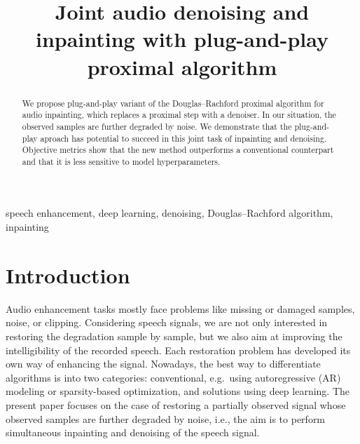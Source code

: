 \documentclass[conference]{IEEEtran}
\begin{document}
\title{Joint audio denoising and inpainting with plug-and-play proximal algorithm}

\author{
\and
{}
}

\maketitle

\begin{abstract}
We propose plug-and-play variant of the Douglas--Rachford proximal algorithm for audio inpainting, which replaces a proximal step with a denoiser.
In our situation, the observed samples are further degraded by noise.
We demonstrate that the plug-and-play aproach has potential to succeed in this joint task of inpainting and denoising.
Objective metrics show that the new method outperforms a conventional counterpart and that it is less sensitive to model hyperparameters.
\end{abstract}

\begin{IEEEkeywords}
speech enhancement, deep learning, denoising, Douglas--Rachford algorithm, inpainting
\end{IEEEkeywords}

\section{Introduction}

Audio enhancement tasks mostly face problems like missing or damaged samples, noise, or clipping.
Considering speech signals, 
we are not only interested in restoring the degradation sample by sample, but we also aim at improving the intelligibility of the recorded speech.
Each restoration problem has developed its own way of enhancing the signal.
Nowadays, the best way to differentiate algorithms is into two categories:
conventional, e.g.\ using autoregressive (AR) modeling or sparsity-based optimization, and solutions using deep learning.
The present paper focuses on the case of restoring a partially observed signal whose observed samples are further degraded by noise, i.e., the aim is to perform simultaneous inpainting and denoising of the speech signal.
\end{document}
